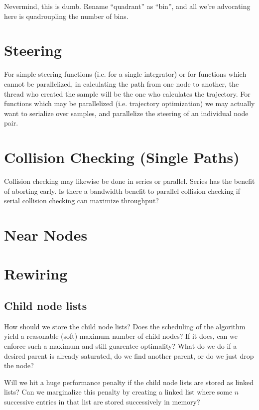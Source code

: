 Nevermind, this is dumb. Rename ``quadrant'' as ``bin'', and all we're advocating here is quadroupling the number of bins.





\section{Steering}

For simple steering functions (i.e. for a single integrator) or for functions which cannot be parallelized, in calculating the path from one node to another, the thread who created the sample will be the one who calculates the trajectory. For functions which may be parallelized (i.e. trajectory optimization) we may actually want to serialize over samples, and parallelize the steering of an individual node pair. 

\section{Collision Checking (Single Paths)}

Collision checking may likewise be done in series or parallel. Series has the benefit of aborting early. Is there a bandwidth benefit to parallel collision checking if serial collision checking can maximize throughput?


\section{Near Nodes}

\section{Rewiring}



\subsection{Child node lists}

How should we store the child node lists? Does the scheduling of the algorithm yield a reasonable (soft) maximum number of child nodes? If it does, can we enforce such a maximum and still guarentee optimality? What do we do if a desired parent is already saturated, do we find another parent, or do we just drop the node?

Will we hit a huge performance penalty if the child node lists are stored as linked lists? Can we marginalize this penalty by creating a linked list where some $n$ successive entries in that list are stored successively in memory?


